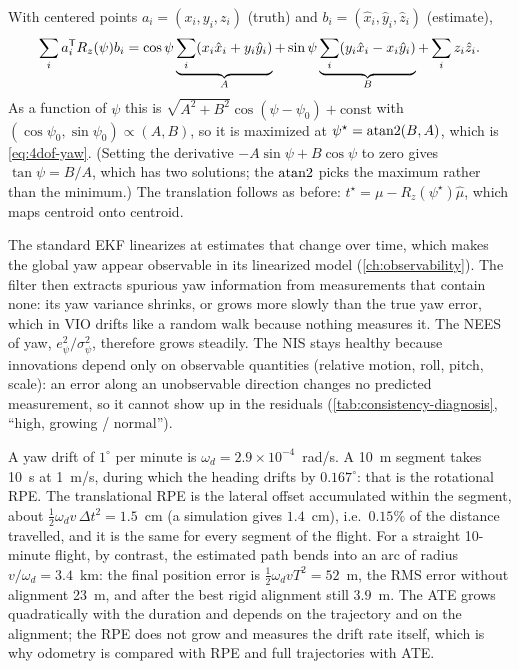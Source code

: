 \begin{solutions}
  \item With centered points $a_i = (x_i, y_i, z_i)$ (truth) and $b_i = (\hat x_i, \hat y_i, \hat z_i)$ (estimate),
        \[
          \sum_ia_i^{\mathsf{T}} R_z(\psi)b_i = \cos\psi\underbrace{\sum_i(x_i\hat x_i + y_i\hat y_i)}_{A} + \sin\psi\underbrace{\sum_i(y_i\hat x_i - x_i\hat y_i)}_{B} + \sum_iz_i\hat z_i .
        \]
        As a function of $\psi$ this is $\sqrt{A^2 + B^2}\cos(\psi - \psi_0) + \text{const}$ with $(\cos\psi_0, \sin\psi_0) \propto (A, B)$, so it is maximized at
        $\psi^\star = \operatorname{atan2}(B, A)$, which is \eqref{eq:4dof-yaw}. (Setting the derivative $-A\sin\psi + B\cos\psi$
        to zero gives $\tan\psi = B/A$, which has two solutions; the $\operatorname{atan2}$ picks the maximum rather than the minimum.) The translation follows
        as before: $t^\star = \mu - R_z(\psi^\star)\hat\mu$, which maps centroid onto centroid.

  \item The standard EKF linearizes at estimates that change over time, which makes the global yaw appear observable in its linearized model
        (\cref{ch:observability}). The filter then extracts spurious yaw information from measurements that contain none: its yaw variance shrinks,
        or grows more slowly than the true yaw error, which in VIO drifts like a random walk because nothing measures it. The NEES of yaw,
        $e_\psi^2/\sigma_\psi^2$, therefore grows steadily. The NIS stays healthy because innovations depend only on observable quantities (relative motion,
        roll, pitch, scale): an error along an unobservable direction changes no predicted measurement, so it cannot show up in the residuals
        (\cref{tab:consistency-diagnosis}, ``high, growing / normal'').

  \item A yaw drift of $1^\circ$ per minute is $\omega_d = 2.9\times10^{-4}$~rad/s. A 10~m segment takes 10~s at 1~m/s, during which the heading drifts by
        $0.167^\circ$: that is the rotational RPE. The translational RPE is the lateral offset accumulated within the segment, about
        $\tfrac12\omega_dv\,\Delta t^2 = 1.5$~cm (a simulation gives $1.4$~cm), i.e.\ $0.15\%$ of the distance travelled, and it is the same for every segment of the
        flight. For a straight 10-minute flight, by contrast, the estimated path bends into an arc of radius $v/\omega_d = 3.4$~km: the final position error is
        $\tfrac12\omega_dvT^2 = 52$~m, the RMS error without alignment 23~m, and after the best rigid alignment still $3.9$~m. The ATE grows quadratically
        with the duration and depends on the trajectory and on the alignment; the RPE does not grow and measures the drift rate itself, which is why
        odometry is compared with RPE and full trajectories with ATE.
\end{solutions}
